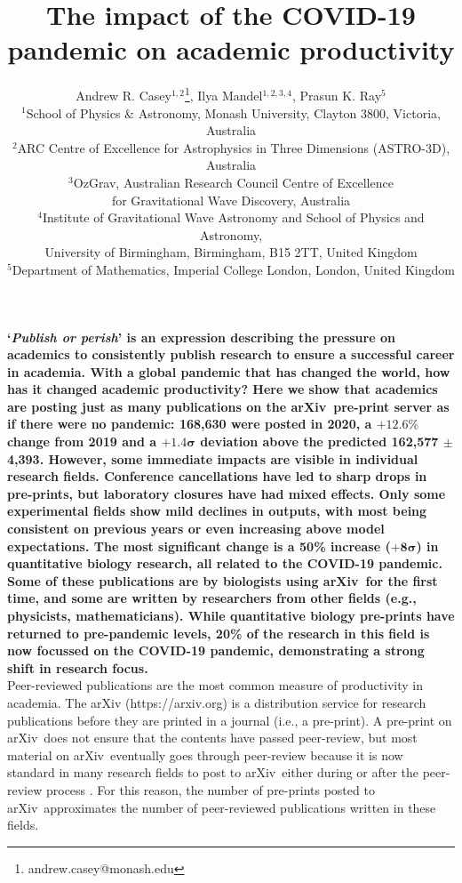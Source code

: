 \documentclass[a4paper,12pt]{article}
\title{The impact of the COVID-19 pandemic on academic productivity}
\author{Andrew R. Casey$^{1,2}$\footnote{andrew.casey@monash.edu},
        Ilya Mandel$^{1,2,3,4}$,
        Prasun K. Ray$^{5}$\\
\normalsize{$^{1}$School of Physics \& Astronomy, Monash University, Clayton 3800, Victoria, Australia}\\
\normalsize{$^{2}$ARC Centre of Excellence for Astrophysics in Three Dimensions (ASTRO-3D), Australia}\\
\normalsize{$^{3}$OzGrav, Australian Research Council Centre of Excellence}\\
\normalsize{for Gravitational Wave Discovery, Australia}\\
\normalsize{$^{4}$Institute of Gravitational Wave Astronomy and School of Physics and Astronomy,}\\
\normalsize{University of Birmingham, Birmingham, B15 2TT, United Kingdom}\\
\normalsize{$^{5}$Department of Mathematics, Imperial College London, London, United Kingdom}
}
\date{}
\newcommand{\arxiv}{arXiv}
\begin{document}
\newpage
\setcounter{page}{1}
\resetlinenumber[1]

\maketitle


\noindent \textbf{`\emph{Publish or perish}' is an expression describing the pressure on academics to consistently publish research to ensure a successful career in academia. 
With a global pandemic that has changed the world, how has it changed academic productivity? 
Here we show that academics are posting just as many publications on the \arxiv\ pre-print server as if there were no pandemic: 168,630 were posted in 2020, a $\mathbf{+12.6\%}$ change from 2019 and a $\mathbf{+1.4\sigma}$ deviation above the predicted 162,577 $\mathbf{\pm}$ 4,393.
However, some immediate impacts are visible in individual research fields.
Conference cancellations have led to sharp drops in pre-prints, but laboratory closures have had mixed effects.
Only some experimental fields show mild declines in outputs, with most being consistent on previous years or even increasing above model expectations.
The most significant change is a 50\% increase ($\mathbf{+8\sigma}$) in quantitative biology research, all related to the COVID-19 pandemic.
Some of these publications are by biologists using \arxiv\ for the first time, and some are written by researchers from other fields (e.g., physicists, mathematicians).
While quantitative biology pre-prints have returned to pre-pandemic levels, 20\% of the research in this field is now focussed on the COVID-19 pandemic, demonstrating a strong shift in research focus.
}\\

\noindent Peer-reviewed publications are the most common measure of productivity in academia. The \arxiv\cite{Ginsparg:2011} ({https://arxiv.org}) is a distribution service for research publications before they are printed in a journal (i.e., a pre-print). A pre-print on \arxiv\ does not ensure that the contents have passed peer-review, but most material on \arxiv\ eventually goes through peer-review because it is now standard in many research fields to post to \arxiv\ either during or after the peer-review process \cite{Lariviere:2014}. For this reason, the number of pre-prints posted to \arxiv\ approximates the number of peer-reviewed publications written in these fields.
\end{document}
